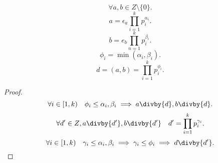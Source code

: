 \documentclass[11pt, oneside]{article}   	%
\begin{document}
    \begin{tlemma}
        \[ \forall{a, b \in Z}\setminus \{0\}  .\] 
        \[ a = \epsilon_a \prod_{i=1}^{k} p_i^{\alpha_i}  .\]
        \[ b = e_b \prod_{n=1}^{k} p_i^{\beta_i}  .\] 
        \[ \phi_i = \min\left( \alpha_i, \beta_i \right)  .\]
        \[ d=\left( a, b \right)=\prod_{i=1}^{k} p_i^{\phi_i}  .\]
        \begin{proof}
            \[\forall{i \in \left[1, k\right)}\quad \phi_i \le  \alpha_i, \beta_i \implies a\divby{d}, b\divby{d} .\]
            \[ \forall{d' \in Z}, a\divby{d'}, b\divby{d'}\quad d' = \prod_{i=1}^{k} p_i^{\gamma_i}  .\] 
            \[ \forall{i \in [1, k)}\quad \gamma_i \le \alpha_i, \beta_i \implies \gamma_i \le \phi_i \implies d\divby{d'} .\qedhere\] 
        \end{proof}
    \end{tlemma}
\end{document}
